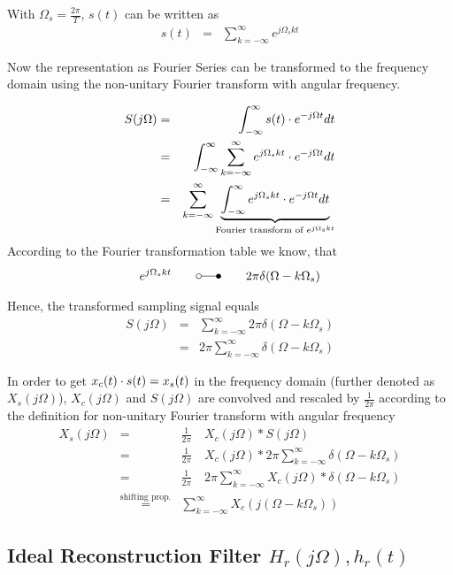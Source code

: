 With $\Omega_s = \frac{2\pi}{T}$, $s(t)$ can be written as
\begin{eqnarray*}
s(t) & = & \sum_{k=-\infty}^{\infty} e^{j \Omega_s k t}
\end{eqnarray*}

Now the representation as Fourier Series can be transformed to the frequency domain using the non-unitary Fourier transform with angular frequency.

\begin{eqnarray*}
S(j\Omega) & = & \int_{-\infty}^{\infty} s(t) \cdot e^{-j \Omega t} dt \\
 & = & \int_{-\infty}^{\infty} \sum_{k=-\infty}^{\infty} e^{j \Omega_s k t} \cdot e^{-j \Omega t} dt \\
 & = & \sum_{k=-\infty}^{\infty}  \underbrace{\int_{-\infty}^{\infty} e^{j \Omega_s k t} \cdot e^{-j \Omega t} dt}_{\text{Fourier transform of }e^{j \Omega_s k t}}
\end{eqnarray*}
According to the Fourier transformation table we know, that
\begin{eqnarray*}
e^{j \Omega_s k t} \qquad \laplace \qquad 2\pi \delta(\Omega - k\Omega_s)
\end{eqnarray*}

Hence, the transformed sampling signal equals
\begin{eqnarray*}
S(j\Omega) & = & \sum_{k=-\infty}^{\infty} 2\pi \delta(\Omega - k\Omega_s) \\
& = & 2\pi \sum_{k=-\infty}^{\infty} \delta(\Omega - k\Omega_s)
\end{eqnarray*}

In order to get $x_c(t) \cdot s(t) = x_s(t)$ in the frequency domain (further denoted as $X_s(j\Omega)$), $X_c(j\Omega)$ and $S(j\Omega)$ are convolved and rescaled by $\frac{1}{2\pi}$ according to the definition for non-unitary Fourier transform with angular frequency
\begin{eqnarray*}
X_s(j\Omega) & = & \frac{1}{2\pi} \quad X_c(j\Omega) \ast S(j\Omega) \\
 & = & \frac{1}{2\pi} \quad X_c(j\Omega) \ast 2\pi \sum_{k=-\infty}^{\infty} \delta(\Omega - k\Omega_s) \\
 & = & \frac{1}{2\pi} \quad 2\pi \sum_{k=-\infty}^{\infty} X_c(j\Omega) \ast \delta(\Omega - k\Omega_s) \\
 & \overset{\text{shifting prop.}}{=} & \sum_{k=-\infty}^{\infty} X_c(j(\Omega-k\Omega_s) )
\end{eqnarray*}

\subsection{Ideal Reconstruction Filter $H_r(j\Omega), h_r(t)$}

